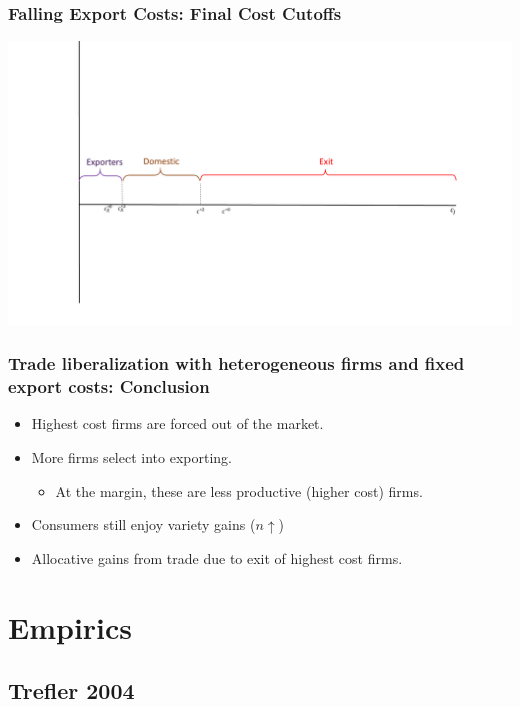 \documentclass{beamer}
\begin{document}
\begin{frame}
	\frametitle{Falling Export Costs: Final Cost Cutoffs}
	\includegraphics[scale=0.32]{SL4_30.pdf}
	
\end{frame}

\begin{frame}
	\frametitle{Trade liberalization with heterogeneous firms and fixed export costs: Conclusion}
		\begin{itemize}
			\item Highest cost firms are forced out of the market.
			\item More firms select into exporting.
				\begin{itemize}
					\item At the margin, these are less productive (higher cost) firms. 
				\end{itemize}
			\item Consumers still enjoy variety gains ($n\uparrow$)
			\item Allocative gains from trade due to exit of highest cost firms.

		\end{itemize}
	
\end{frame}

\section{Empirics}

\subsection{Trefler 2004}
\end{document}
